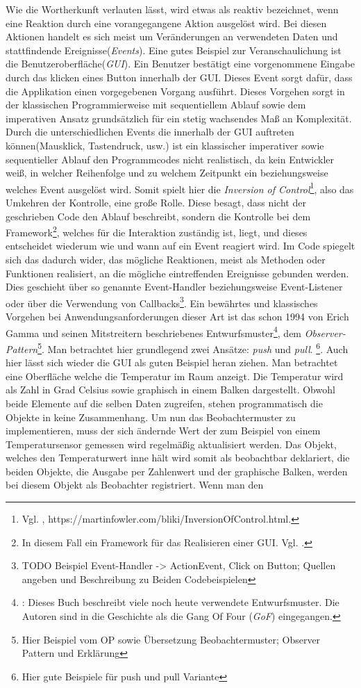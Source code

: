 Wie die Wortherkunft verlauten lässt, wird etwas als reaktiv bezeichnet, wenn eine Reaktion durch eine vorangegangene Aktion ausgelöst wird. Bei diesen Aktionen handelt es sich meist um Veränderungen an verwendeten Daten und stattfindende Ereignisse(\textit{Events}). Eine gutes Beispiel zur Veranschaulichung ist die Benutzeroberfläche(\textit{GUI}). Ein Benutzer bestätigt eine vorgenommene Eingabe durch das klicken eines Button innerhalb der GUI. Dieses Event sorgt dafür, dass die Applikation einen vorgegebenen Vorgang ausführt. Dieses Vorgehen sorgt in der klassischen Programmierweise mit sequentiellem Ablauf sowie dem imperativen Ansatz grundsätzlich für ein stetig wachsendes Maß an Komplexität. Durch die unterschiedlichen Events die innerhalb der GUI auftreten können(Mausklick, Tastendruck, usw.) ist ein klassischer imperativer sowie sequentieller Ablauf den Programmcodes nicht realistisch, da kein Entwickler weiß, in welcher Reihenfolge und zu welchem Zeitpunkt ein beziehungsweise welches Event ausgelöst wird. Somit spielt hier die \textit{Inversion of Control}\footnote{Vgl. \cite{MartinFowler.2005}, https://martinfowler.com/bliki/InversionOfControl.html.}, also das Umkehren der Kontrolle, eine große Rolle. Diese besagt, dass nicht der geschrieben Code den Ablauf beschreibt, sondern die Kontrolle bei dem Framework\footnote{In diesem Fall ein Framework für das Realisieren einer GUI. Vgl. \cite{wiki.guilist}.}, welches für die Interaktion zuständig ist, liegt, und dieses entscheidet wiederum wie und wann auf ein Event reagiert wird. Im Code spiegelt sich das dadurch wider, das mögliche Reaktionen, meist als Methoden oder Funktionen realisiert, an die mögliche eintreffenden Ereignisse gebunden werden. Dies geschieht über so genannte Event-Handler beziehungsweise Event-Listener oder über die Verwendung von Callbacks\footnote{TODO Beispiel Event-Handler -> ActionEvent, Click on Button; Quellen angeben und Beschreibung zu Beiden Codebeispielen}. Ein bewährtes und klassisches Vorgehen bei Anwendungsanforderungen dieser Art ist das schon 1994 von Erich Gamma und seinen Mitstreitern beschriebenes Entwurfsmuster\footnote{\cite{Gamma.2011}: Dieses Buch beschreibt viele noch heute verwendete Entwurfsmuster. Die Autoren sind in die Geschichte als die Gang Of Four (\textit{GoF}) eingegangen.}, dem \textit{Observer-Pattern}\footnote{Hier Beispiel vom OP sowie Übersetzung Beobachtermuster; Observer Pattern und Erklärung}. Man betrachtet hier grundlegend zwei Ansätze: \textit{push}  und \textit{pull}. \footnote{Hier gute Beispiele für push und pull Variante}. Auch hier lässt sich wieder die GUI als guten Beispiel heran ziehen. Man betrachtet eine Oberfläche welche die Temperatur im Raum anzeigt. Die Temperatur wird als Zahl in Grad Celsius sowie graphisch in einem Balken dargestellt. Obwohl beide Elemente auf die selben Daten zugreifen, stehen programmatisch die Objekte in keine Zusammenhang. Um nun das Beobachtermuster zu implementieren, muss der sich ändernde Wert der zum Beispiel von einem Temperatursensor gemessen wird regelmäßig aktualisiert werden. Das Objekt, welches den Temperaturwert inne hält wird somit als beobachtbar deklariert, die beiden Objekte, die Ausgabe per Zahlenwert und der graphische Balken, werden bei diesem Objekt als Beobachter registriert. Wenn man den 